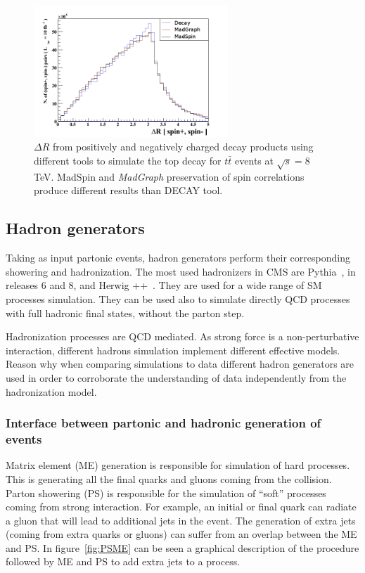 \begin{figure}[!Hhtbp]
  \begin{center}
    \includegraphics[width=0.65\textwidth]{figs/TT_MadSPin_2.png}
    \caption{$\Delta R$ from positively and negatively charged decay products using different tools to simulate the top decay for $t\bar{t}$ events at $\sqrt{s}=8$ TeV. MadSpin and \textit{MadGraph} preservation of spin correlations produce different results than DECAY tool.}
    \label{fig:MS2}
  \end{center}
\end{figure}

\subsection{Hadron generators}
\label{sec:Had}

Taking as input partonic events, hadron generators perform their corresponding showering and hadronization. The most used hadronizers in CMS are Pythia~\cite{Sjostrand:2006za}, in releases 6 and 8, and Herwig ++~\cite{Bahr:2008pv}. They are used for a wide range of SM processes simulation. They can be used also to simulate directly QCD processes with full hadronic final states, without the parton step.

Hadronization processes are QCD mediated. As strong force is a non-perturbative interaction, different hadrons simulation implement different effective models. Reason why when comparing simulations to data different hadron generators are used in order to corroborate the understanding of data independently from the hadronization model. 

\subsubsection{Interface between partonic and hadronic generation of events}
\label{sec:Merging}

Matrix element (ME) generation is responsible for simulation of hard processes. This is generating all the final quarks and gluons coming from the collision. Parton showering (PS) is responsible for the simulation of ``soft'' processes coming from strong interaction. For example, an initial or final quark can radiate a gluon that will lead to additional jets in the event. The generation of extra jets (coming from extra quarks or gluons) can suffer from an overlap between the ME and PS. In figure~\ref{fig:PSME} can be seen a graphical description of the procedure followed by ME and PS to add extra jets to a process. 


